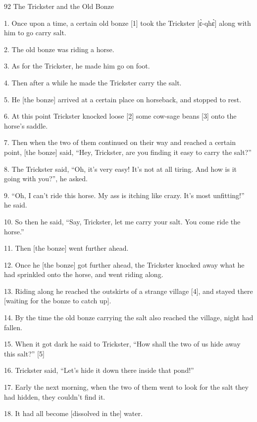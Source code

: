 
{\LARGE{}92 The Trickster and the Old Bonze}

{\LARGE{}1. Once upon a time, a certain old bonze [1] took the Trickster [ɛ̀-qhɛ̀]
along with him to go carry salt.}

{\LARGE{}2. The old bonze was riding a horse.}

{\LARGE{}3. As for the Trickster, he made him go on foot.}

{\LARGE{}4. Then after a while he made the Trickster carry the salt.}

{\LARGE{}5. He [the bonze] arrived at a certain place on horseback, and stopped
to rest.}

{\LARGE{}6. At this point Trickster knocked loose [2] some cow-sage beans [3] onto
the horse's saddle.}

{\LARGE{}7. Then when the two of them continued on their way and reached a certain
point, [the bonze] said, ``Hey, Trickster, are you finding it easy to carry the
salt?''}

{\LARGE{}8. The Trickster said, ``Oh, it's very easy! It's not at all tiring. And
how is it going with you?'', he asked.}

{\LARGE{}9. ``Oh, I can't ride this horse. My ass is itching like crazy. It's most
unfitting!'' he said.}

{\LARGE{}10. So then he said, ``Say, Trickster, let me carry your salt. You come
ride the horse.''}

{\LARGE{}11. Then [the bonze] went further ahead.}

{\LARGE{}12. Once he [the bonze] got further ahead, the Trickster knocked away
what he had sprinkled onto the horse, and went riding along.}

{\LARGE{}13. Riding along he reached the outskirts of a strange village [4], and
stayed there [waiting for the bonze to catch up].}

{\LARGE{}14. By the time the old bonze carrying the salt also reached the village,
night had fallen.}

{\LARGE{}15. When it got dark he said to Trickster, ``How shall the two of us hide
away this salt?'' [5]}

{\LARGE{}16. Trickster said, ``Let's hide it down there inside that pond!''}

{\LARGE{}17. Early the next morning, when the two of them went to look for the
salt they had hidden, they couldn't find it.}

{\LARGE{}18. It had all become [dissolved in the] water.}

